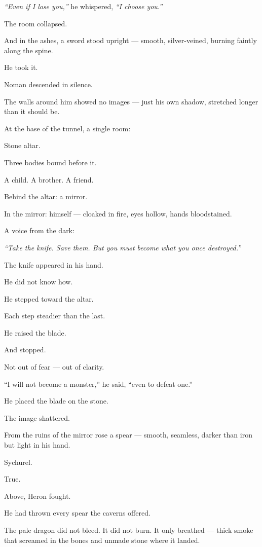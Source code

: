 \documentclass[12pt]{article}
\begin{document}
\textit{“Even if I lose you,”} he whispered, \textit{“I choose you.”}

The room collapsed.

And in the ashes, a sword stood upright — smooth, silver-veined, burning faintly along the spine.

He took it.

\bigskip

Noman descended in silence.

The walls around him showed no images — just his own shadow, stretched longer than it should be.

At the base of the tunnel, a single room:

Stone altar.

Three bodies bound before it.

A child. A brother. A friend.

Behind the altar: a mirror.

In the mirror: himself — cloaked in fire, eyes hollow, hands bloodstained.

A voice from the dark:

\textit{“Take the knife. Save them. But you must become what you once destroyed.”}

The knife appeared in his hand.

He did not know how.

He stepped toward the altar.

Each step steadier than the last.

He raised the blade.

And stopped.

Not out of fear — out of clarity.

“I will not become a monster,” he said, “even to defeat one.”

He placed the blade on the stone.

The image shattered.

From the ruins of the mirror rose a spear — smooth, seamless, darker than iron but light in his hand.

Sychurel.

True.

\bigskip

Above, Heron fought.

He had thrown every spear the caverns offered.

The pale dragon did not bleed. It did not burn. It only breathed — thick smoke that screamed in the bones and unmade stone where it landed.
\end{document}
